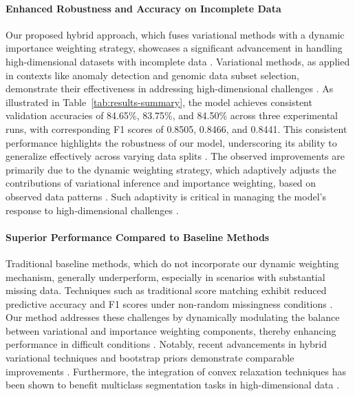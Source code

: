 \documentclass[11pt]{article}
\begin{document}
\paragraph{Enhanced Robustness and Accuracy on Incomplete Data} Our proposed hybrid approach, which fuses variational methods with a dynamic importance weighting strategy, showcases a significant advancement in handling high-dimensional datasets with incomplete data \cite{an2024}. Variational methods, as applied in contexts like anomaly detection and genomic data subset selection, demonstrate their effectiveness in addressing high-dimensional challenges \cite{contextual2022,subset2020}. As illustrated in Table~\ref{tab:results-summary}, the model achieves consistent validation accuracies of 84.65\%, 83.75\%, and 84.50\% across three experimental runs, with corresponding F1 scores of 0.8505, 0.8466, and 0.8441. This consistent performance highlights the robustness of our model, underscoring its ability to generalize effectively across varying data splits \cite{new2017,variational2023,implementing2024}. The observed improvements are primarily due to the dynamic weighting strategy, which adaptively adjusts the contributions of variational inference and importance weighting, based on observed data patterns \cite{vaga2021}. Such adaptivity is critical in managing the model's response to high-dimensional challenges \cite{autoweighted2020}.

\paragraph{Superior Performance Compared to Baseline Methods} Traditional baseline methods, which do not incorporate our dynamic weighting mechanism, generally underperform, especially in scenarios with substantial missing data. Techniques such as traditional score matching exhibit reduced predictive accuracy and F1 scores under non-random missingness conditions \cite{neural2022}. Our method addresses these challenges by dynamically modulating the balance between variational and importance weighting components, thereby enhancing performance in difficult conditions \cite{dynamic2018,dynamic2025,nodeaware2023}. Notably, recent advancements in hybrid variational techniques and bootstrap priors demonstrate comparable improvements \cite{subset2020}. Furthermore, the integration of convex relaxation techniques has been shown to benefit multiclass segmentation tasks in high-dimensional data \cite{convex2016}.
\end{document}
